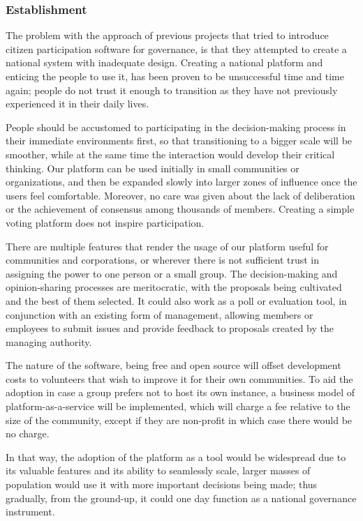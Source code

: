\documentclass[a4paper,11pt]{article}
\begin{document}
\begin{multicols}{2}
\subsubsection{Establishment} \label{establishmentnational}

The problem with the approach of previous projects that tried to introduce citizen participation software for governance, is that they attempted to create a national system with inadequate design. Creating a national platform and enticing the people to use it, has been proven to be unsuccessful time and time again; people do not trust it enough to transition as they have not previously experienced it in their daily lives.

People should be accustomed to participating in the decision-making process in their immediate environments first, so that transitioning to a bigger scale will be smoother, while at the same time the interaction would develop their critical thinking. Our platform can be used initially in small communities or organizations, and then be expanded slowly into larger zones of influence once the users feel comfortable. Moreover, no care was given about the lack of deliberation or the achievement of consensus among thousands of members. Creating a simple voting platform does not inspire participation.

There are multiple features that render the usage of our platform useful for communities and corporations, or wherever there is not sufficient trust in assigning the power to one person or a small group. The decision-making and opinion-sharing processes are meritocratic, with the proposals being cultivated and the best of them selected. It could also work as a poll or evaluation tool, in conjunction with an existing form of management, allowing members or employees to submit issues and provide feedback to proposals created by the managing authority.

The nature of the software, being free and open source will offset development costs to volunteers that wish to improve it for their own communities. To aid the adoption in case a group prefers not to host its own instance, a business model of platform-as-a-service will be implemented, which will charge a fee relative to the size of the community, except if they are non-profit in which case there would be no charge.

In that way, the adoption of the platform as a tool would be widespread due to its valuable features and its ability to seamlessly scale, larger masses of population would use it with more important decisions being made; thus gradually, from the ground-up, it could one day function as a national governance instrument.


\end{multicols}
\end{document}
